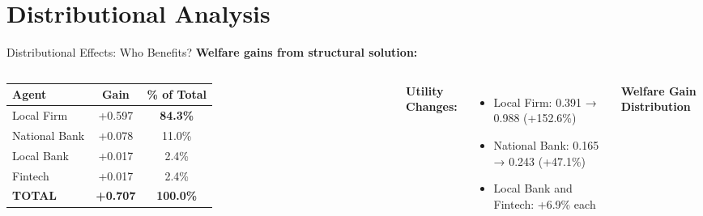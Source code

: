 \documentclass[aspectratio=169]{beamer}
\begin{document}
\section{Distributional Analysis}

\begin{frame}{Distributional Effects: Who Benefits?}
    \textbf{Welfare gains from structural solution:}
    
    \vspace{0.3cm}
    \begin{columns}
        \begin{table}
            \centering
            \small
            \begin{tabular}{lcc}
                \toprule
                \textbf{Agent} & \textbf{Gain} & \textbf{\% of Total} \\
                \midrule
                Local Firm & +0.597 & \textcolor{SafeGreen}{\textbf{84.3\%}} \\
                National Bank & +0.078 & 11.0\% \\
                Local Bank & +0.017 & 2.4\% \\
                Fintech & +0.017 & 2.4\% \\
                \midrule
                \textbf{TOTAL} & \textbf{+0.707} & \textbf{100.0\%} \\
                \bottomrule
            \end{tabular}
        \end{table}
        
        \vspace{0.3cm}
        \textbf{Utility Changes:}
        \begin{itemize}
            \item Local Firm: 0.391 → 0.988 \textcolor{SafeGreen}{(+152.6\%)}
            \item National Bank: 0.165 → 0.243 (+47.1\%)
            \item Local Bank and Fintech: +6.9\% each
        \end{itemize}
        
        \centering
        \textbf{Welfare Gain Distribution}
        
        \vspace{0.2cm}
        

\end{columns}
\end{frame}
\end{document}
